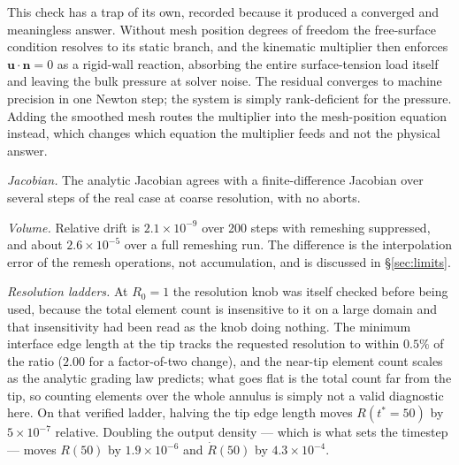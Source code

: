 \documentclass[11pt,a4paper]{article}
\begin{document}
This check has a trap of its own, recorded because it produced a converged and
meaningless answer. Without mesh position degrees of freedom the free-surface
condition resolves to its static branch, and the kinematic multiplier then
enforces $\mathbf{u}\cdot\mathbf{n}=0$ as a rigid-wall reaction, absorbing the
entire surface-tension load itself and leaving the bulk pressure at solver
noise. The residual converges to machine precision in one Newton step; the
system is simply rank-deficient for the pressure. Adding the smoothed mesh
routes the multiplier into the mesh-position equation instead, which changes
which equation the multiplier feeds and not the physical answer.

\emph{Jacobian.} The analytic Jacobian agrees with a finite-difference Jacobian
over several steps of the real case at coarse resolution, with no aborts.

\emph{Volume.} Relative drift is $2.1\times10^{-9}$ over 200 steps with
remeshing suppressed, and about $2.6\times10^{-5}$ over a full remeshing run.
The difference is the interpolation error of the remesh operations, not
accumulation, and is discussed in \S\ref{sec:limits}.

\emph{Resolution ladders.} At $R_{0}=1$ the resolution knob was itself checked
before being used, because the total element count is insensitive to it on a
large domain and that insensitivity had been read as the knob doing nothing.
The minimum interface edge length at the tip tracks the requested resolution to
within $0.5\%$ of the ratio ($2.00$ for a factor-of-two change), and the near-tip
element count scales as the analytic grading law predicts; what goes flat is the
total count far from the tip, so counting elements over the whole annulus is
simply not a valid diagnostic here. On that verified ladder, halving the tip
edge length moves $R(t^{*}=50)$ by $5\times10^{-7}$ relative. Doubling the
output density --- which is what sets the timestep --- moves $R(50)$ by
$1.9\times10^{-6}$ and $\dot{R}(50)$ by $4.3\times10^{-4}$.
\end{document}
